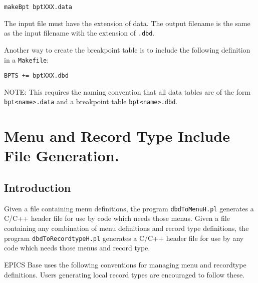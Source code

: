 \begin{lstlisting}[language=dbd]
makeBpt bptXXX.data
\end{lstlisting}

The input file must have the extension of data.
The output filename is the same as the input filename with the extension of \verb|.dbd|.

Another way to create the breakpoint table is to include the following definition in a \verb|Makefile|:

\begin{lstlisting}[language=dbd]
BPTS += bptXXX.dbd
\end{lstlisting}

NOTE: This requires the naming convention that all data tables are of the form \verb|bpt<name>.data| and a breakpoint table \verb|bpt<name>.dbd|.

\section{Menu and Record Type Include File Generation.}

\subsection{Introduction}

Given a file containing menu definitions, the program \verb|dbdToMenuH.pl| generates a C/C++ header file for use by code which needs those menus.
Given a file containing any combination of menu definitions and record type definitions, the program \verb|dbdToRecordtypeH.pl| generates a C/C++ header file for use by any code which needs those menus and record type.

EPICS Base uses the following conventions for managing menu and recordtype definitions.
Users generating local record types are encouraged to follow these.

